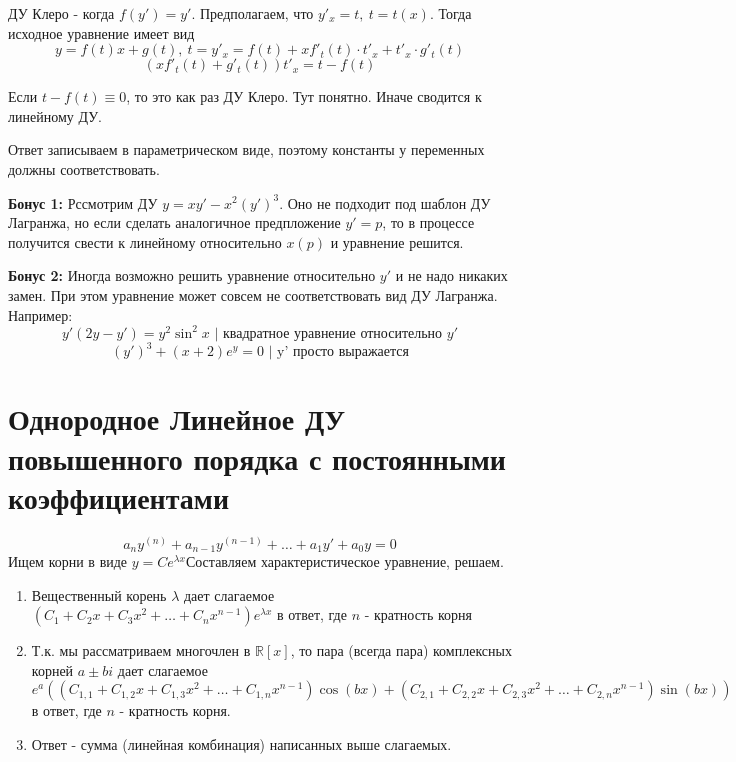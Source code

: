 \documentclass[11pt]{article}
\begin{document}
	ДУ Клеро - когда $f(y') = y'$. Предполагаем, что $y'_x = t,\ t = t(x)$. Тогда исходное уравнение имеет вид
	$$y = f(t) x + g(t),\ t = y'_x = f(t) + xf'_t(t)\cdot t'_x + t'_x\cdot g'_t(t) $$
	$$(xf'_t(t) + g'_t(t))t'_x = t - f(t)$$
	
	Если $t - f(t) \equiv 0$, то это как раз ДУ Клеро. Тут понятно. Иначе сводится к линейному ДУ.
	
	Ответ записываем в параметрическом виде, поэтому константы у переменных должны соответствовать.
	
	\textbf{Бонус 1:} Рссмотрим ДУ $y = xy' - x^2 (y')^3$. Оно не подходит под шаблон ДУ Лагранжа, но если сделать аналогичное предпложение $y' = p$, то в процессе получится свести к линейному относительно $x(p)$ и уравнение решится.
	
	\textbf{Бонус 2:} Иногда возможно решить уравнение относительно $y'$ и не надо никаких замен. При этом уравнение может совсем не соответствовать вид ДУ Лагранжа. Например:
	$$y'(2y - y') = y^2 \sin^2 x \text{ | квадратное уравнение относительно } y'$$ 
	$$(y')^3 + (x+2)e^y = 0 \text{ | y' просто выражается}$$ 

	\section{Однородное Линейное ДУ повышенного порядка с постоянными коэффициентами}
	$$a_{n} y^{(n)} +a_{n-1} y^{(n-1)} + \dots + a_{1} y' + a_{0} y = 0 $$
	Ищем корни в виде $y = Ce^{\lambda x}$Составляем характеристическое уравнение, решаем.
	\begin{enumerate}
		\item Вещественный корень $\lambda$ дает слагаемое $(C_1 + C_2 x + C_3 x^2 + \dots + C_n x^{n-1})e^{\lambda x}$ в ответ, где $n$ - кратность корня
		\item Т.к. мы рассматриваем многочлен в $\mathbb{R}[x]$, то пара (всегда пара) комплексных корней $a \pm bi$ дает слагаемое $e^a((C_{1, 1} + C_{1, 2} x + C_{1, 3} x^2 + \dots + C_{1, n} x^{n-1}) \cos(bx) + (C_{2, 1} + C_{2, 2} x + C_{2, 3} x^2 + \dots + C_{2, n} x^{n-1}) \sin(bx))$ в ответ, где $n$ - кратность корня.
		\item Ответ - сумма (линейная комбинация) написанных выше слагаемых.
		
	\end{enumerate}
\end{document}
